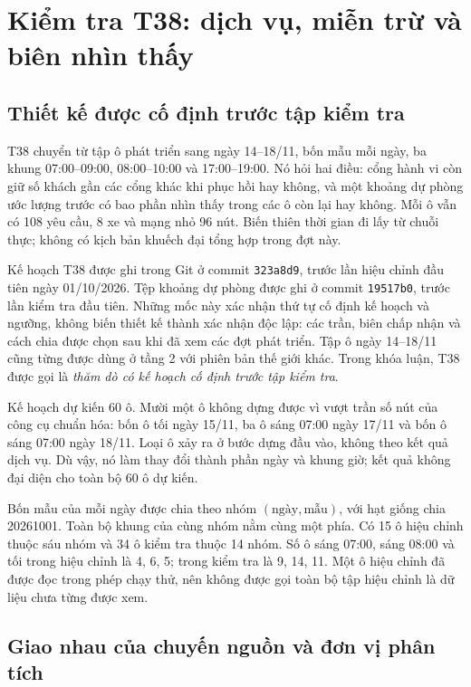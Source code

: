\section{Kiểm tra T38: dịch vụ, miễn trừ và biên nhìn thấy}
\label{muc:t38}
\label{muc:biendukien-t38}

\subsection{Thiết kế được cố định trước tập kiểm tra}

T38 chuyển từ tập ô phát triển sang ngày 14--18/11, bốn mẫu mỗi ngày, ba khung
07:00--09:00, 08:00--10:00 và 17:00--19:00. Nó hỏi hai điều: cổng hành vi còn
giữ số khách gần các cổng khác khi phục hồi hay không, và một khoảng dự phòng
ước lượng trước có bao phần nhìn thấy trong các ô còn lại hay không. Mỗi ô
vẫn có 108 yêu cầu, 8 xe và mạng nhỏ 96 nút. Biến thiên thời gian đi lấy từ
chuỗi thực; không có kịch bản khuếch đại tổng hợp trong đợt này.

Kế hoạch T38 được ghi trong Git ở commit \texttt{323a8d9}, trước lần hiệu chỉnh
đầu tiên ngày 01/10/2026. Tệp khoảng dự phòng được ghi ở commit
\texttt{19517b0}, trước lần kiểm tra đầu tiên. Những mốc này xác nhận thứ tự
cố định kế hoạch và ngưỡng, không biến thiết kế thành xác nhận độc lập:
các trần, biên chấp nhận và cách chia được chọn sau khi đã xem các đợt phát triển.
Tập ô ngày 14--18/11 cũng từng được dùng ở tầng 2 với phiên bản thế giới khác.
Trong khóa luận, T38 được gọi là \emph{thăm dò có kế hoạch cố định trước tập kiểm tra}.

Kế hoạch dự kiến 60 ô. Mười một ô không dựng được vì vượt trần số nút của
công cụ chuẩn hóa: bốn ô tối ngày 15/11, ba ô sáng 07:00 ngày 17/11 và bốn ô
sáng 07:00 ngày 18/11. Loại ô xảy ra ở bước dựng đầu vào, không theo kết quả
dịch vụ. Dù vậy, nó làm thay đổi thành phần ngày và khung giờ; kết quả không
đại diện cho toàn bộ 60 ô dự kiến.

Bốn mẫu của mỗi ngày được chia theo nhóm $(\text{ngày},\text{mẫu})$, với hạt
giống chia 20261001. Toàn bộ khung của cùng nhóm nằm cùng một phía. Có 15 ô
hiệu chỉnh thuộc sáu nhóm và 34 ô kiểm tra thuộc 14 nhóm. Số ô sáng 07:00,
sáng 08:00 và tối trong hiệu chỉnh là 4, 6, 5; trong kiểm tra là 9, 14, 11.
Một ô hiệu chỉnh đã được đọc trong phép chạy thử, nên không được gọi toàn
bộ tập hiệu chỉnh là dữ liệu chưa từng được xem.

\subsection{Giao nhau của chuyến nguồn và đơn vị phân tích}


